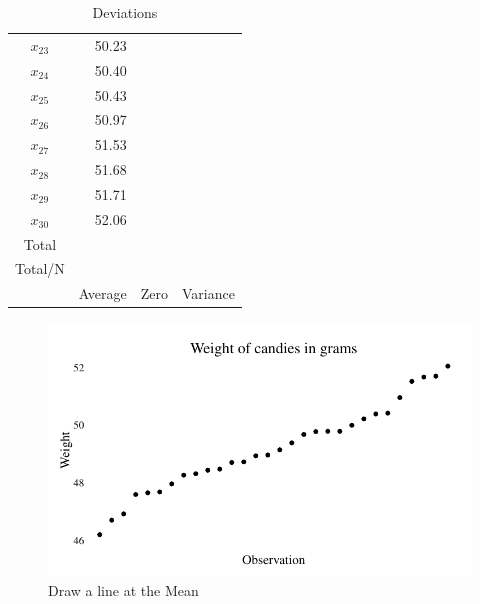 \documentclass[nohyper,justified]{tufte-handout}\usepackage[]{graphicx}\usepackage[]{color}
\makeatletter
\def\maxwidth{ %
  \ifdim\Gin@nat@width>\linewidth
    \linewidth
  \else
    \Gin@nat@width
  \fi
}
\newenvironment{knitrout}{}{} %
\makeatother
\begin{document}
\begin{table}[ht]
{\begin{tabular}{cr|c|c|}
  $x_{23}$ & 50.23 &              &               \\ 
   \rowcolor[gray]{0.95}$x_{24}$ & 50.40 &              &               \\ 
  $x_{25}$ & 50.43 &              &               \\ 
   \rowcolor[gray]{0.95}$x_{26}$ & 50.97 &              &               \\ 
  $x_{27}$ & 51.53 &              &               \\ 
   \rowcolor[gray]{0.95}$x_{28}$ & 51.68 &              &               \\ 
  $x_{29}$ & 51.71 &              &               \\ 
   \rowcolor[gray]{0.95}$x_{30}$ & 52.06 &              &               \\ 
   \bottomrule
Total & & & \\ 
\rowcolor[gray]{0.95}Total/N & & & \\ 
 & Average & Zero & Variance \\
\end{tabular}
}
\caption{Deviations} 
\end{table}



\begin{figure}
\begin{knitrout}
\color{fgcolor}

{\centering \includegraphics[width=\maxwidth]{figure/graphics-center-chart-1} 

}



\end{knitrout}
\caption{Draw a line at the Mean}
\end{figure}
\end{document}
